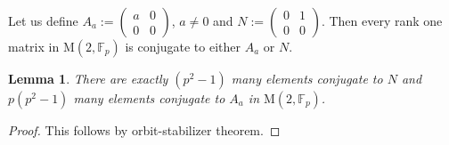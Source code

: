 \documentclass[12pt,reqno]{amsart}
\theoremstyle{plain}
\newtheorem{lemma}[thm]{Lemma}
\theoremstyle{definition}
\newcommand{\M}{\mathrm{M}}
\theoremstyle{remark}
\newcommand{\FF}{\mathbb{F}}
\begin{document}
Let us define $A_a:= \begin{pmatrix}
    a & 0 \\
    0 &0
\end{pmatrix}$, $a\neq 0$ and $N:= \begin{pmatrix}
    0 &1\\
    0 &0
\end{pmatrix}$. Then every rank one matrix in $\M(2, \FF_p)$ is conjugate to either $A_a$ or $N.$
\begin{lemma}
    There are exactly $(p^2-1)$ many elements conjugate to $N$ and $p(p^2-1)$ many elements conjugate to $A_a$ in $\M(2, \FF_p)$.
\end{lemma}
\begin{proof}
    This follows by orbit-stabilizer theorem.
\end{proof}
\end{document}
